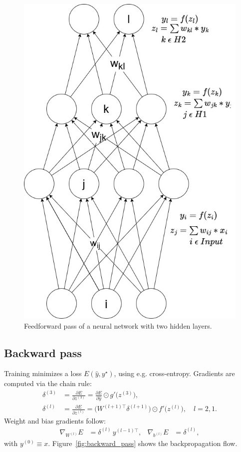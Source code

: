 \begin{figure}[ht]
    \centering 
    \includegraphics[width=0.6\linewidth]{figures/neural_net.jpg}
    \caption{Feedforward pass of a neural network with two hidden layers.} 
    \label{fig:forward_pass}
\end{figure}

\subsection{Backward pass}
Training minimizes a loss \(E(\hat y, y^\star)\), using e.g. cross-entropy. Gradients are computed via the chain rule:
\begin{align}
\delta^{(3)} &= \frac{\partial E}{\partial z^{(3)}}
= \frac{\partial E}{\partial \hat y}\odot g'\bigl(z^{(3)}\bigr),\\
\delta^{(l)} &= \frac{\partial E}{\partial z^{(l)}}
= \bigl(W^{(l+1)\top}\delta^{(l+1)}\bigr)\odot f'\bigl(z^{(l)}\bigr),
\quad l=2,1.
\end{align}
Weight and bias gradients follow:
\begin{align}
\nabla_{W^{(l)}}E &= \delta^{(l)}\,y^{(l-1)\top}, &
\nabla_{b^{(l)}}E &= \delta^{(l)},
\end{align}
with \(y^{(0)}\equiv x\). Figure~\ref{fig:backward_pass} shows the backpropagation flow.

